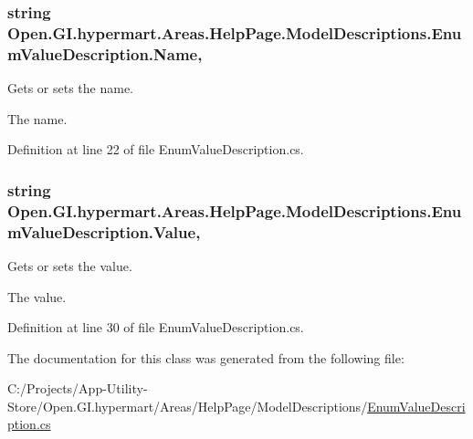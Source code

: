 \subsubsection[{Name}]{\setlength{\rightskip}{0pt plus 5cm}string Open.\+G\+I.\+hypermart.\+Areas.\+Help\+Page.\+Model\+Descriptions.\+Enum\+Value\+Description.\+Name\hspace{0.3cm}{\ttfamily [get]}, {\ttfamily [set]}}\label{class_open_1_1_g_i_1_1hypermart_1_1_areas_1_1_help_page_1_1_model_descriptions_1_1_enum_value_description_a9a7f37f9e6c2a01c41a557b7a8e65d4e}


Gets or sets the name. 

The name. 

Definition at line 22 of file Enum\+Value\+Description.\+cs.

\hypertarget{class_open_1_1_g_i_1_1hypermart_1_1_areas_1_1_help_page_1_1_model_descriptions_1_1_enum_value_description_ab94229a6c9c5afad58abc04d705169f8}{}
\subsubsection[{Value}]{\setlength{\rightskip}{0pt plus 5cm}string Open.\+G\+I.\+hypermart.\+Areas.\+Help\+Page.\+Model\+Descriptions.\+Enum\+Value\+Description.\+Value\hspace{0.3cm}{\ttfamily [get]}, {\ttfamily [set]}}\label{class_open_1_1_g_i_1_1hypermart_1_1_areas_1_1_help_page_1_1_model_descriptions_1_1_enum_value_description_ab94229a6c9c5afad58abc04d705169f8}


Gets or sets the value. 

The value. 

Definition at line 30 of file Enum\+Value\+Description.\+cs.



The documentation for this class was generated from the following file\+:\begin{DoxyCompactItemize}
\item 
C\+:/\+Projects/\+App-\/\+Utility-\/\+Store/\+Open.\+G\+I.\+hypermart/\+Areas/\+Help\+Page/\+Model\+Descriptions/\hyperlink{_enum_value_description_8cs}{Enum\+Value\+Description.\+cs}\end{DoxyCompactItemize}
